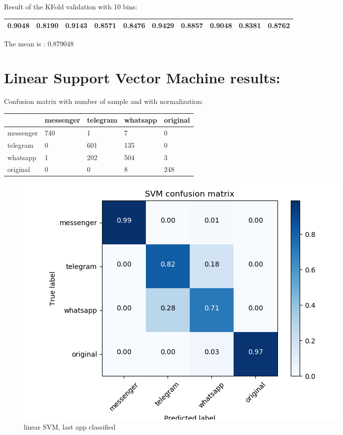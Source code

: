 Result of the KFold validation with 10 bins:
 {\def\arraystretch{1.3} 
 \begin{table}[H] 
\centering 
\begin{tabular}{|l |l |l |l |l |l |l |l |l |l |}  
\hline 
0.9048&
0.8190&
0.9143&
0.8571&
0.8476&
0.9429&
0.8857&
0.9048&
0.8381&
0.8762\\ \hline  

\end{tabular} 
\end{table} }

The mean is : 0.879048\section{Linear Support Vector Machine results:} 
Confusion matrix with number of sample and with normalization:
 {\def\arraystretch{1.3} 
 \begin{table}[H] 
\centering 
\begin{tabular}{|l|l|l|l|l|} 
\hline 
  &messenger  &telegram  &whatsapp  &original  \\ \hline
messenger  &740  &1  &7  &0  \\ \hline
telegram  &0  &601  &135  &0  \\ \hline
whatsapp  &1  &202  &504  &3  \\ \hline
original  &0  &0  &8  &248  \\ \hline
\end{tabular} 
\end{table} }

 \begin{figure}[H] 
\centering 
\includegraphics[scale=.6]{images/lsvm_initial_double_simple.png} 
\caption{linear SVM, last app classified} 
\end{figure} 


